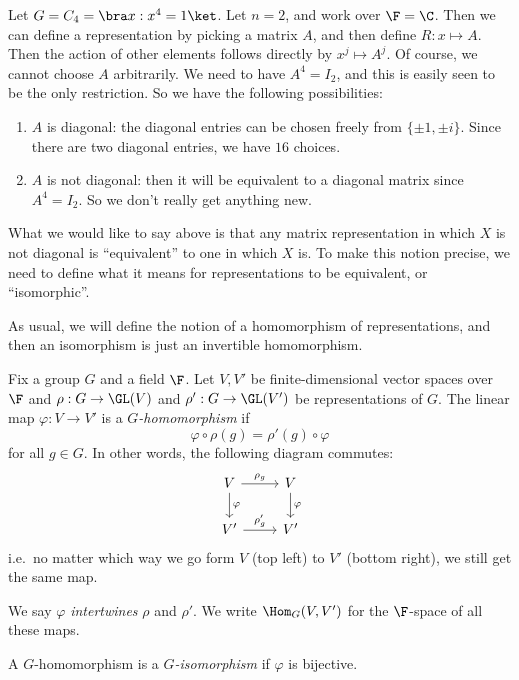 \documentclass[a4paper]{article}
\begin{document}
\begin{eg}
  Let $G = C_4 = \bra x: x^4 = 1\ket$. Let $n = 2$, and work over $\F = \C$. Then we can define a representation by picking a matrix $A$, and then define $R: x \mapsto A$. Then the action of other elements follows directly by $x^j \mapsto A^j$. Of course, we cannot choose $A$ arbitrarily. We need to have $A^4 = I_2$, and this is easily seen to be the only restriction. So we have the following possibilities:
  \begin{enumerate}
    \item $A$ is diagonal: the diagonal entries can be chosen freely from $\{\pm 1, \pm i\}$. Since there are two diagonal entries, we have $16$ choices.
    \item $A$ is not diagonal: then it will be equivalent to a diagonal matrix since $A^4 = I_2$. So we don't really get anything new.
  \end{enumerate}
\end{eg}
What we would like to say above is that any matrix representation in which $X$ is not diagonal is ``equivalent'' to one in which $X$ is. To make this notion precise, we need to define what it means for representations to be equivalent, or ``isomorphic''.

As usual, we will define the notion of a homomorphism of representations, and then an isomorphism is just an invertible homomorphism.

\begin{defi}
  Fix a group $G$ and a field $\F$. Let $V, V'$ be finite-dimensional vector spaces over $\F$ and $\rho: G \to \GL(V)$ and $\rho': G \to \GL(V')$ be representations of $G$. The linear map $\varphi: V \to V'$ is a \emph{$G$-homomorphism} if
  \[
    \varphi \circ \rho(g) = \rho'(g) \circ \varphi\tag{$*$}
  \]
  for all $g \in G$. In other words, the following diagram commutes:
  \[
    \begin{tikzcd}
      V \ar[r, "\rho_g"] \ar[d, "\varphi"] & V \ar[d, "\varphi"]\\
      V' \ar[r, "\rho_g'"] & V'
    \end{tikzcd}
  \]
  i.e.\ no matter which way we go form $V$ (top left) to $V'$ (bottom right), we still get the same map.

  We say $\varphi$ \emph{intertwines} $\rho$ and $\rho'$. We write $\Hom_G(V, V')$ for the $\F$-space of all these maps.
\end{defi}

\begin{defi}[$G$-isomorphism]
  A $G$-homomorphism is a \emph{$G$-isomorphism} if $\varphi$ is bijective.
\end{defi}
\end{document}
